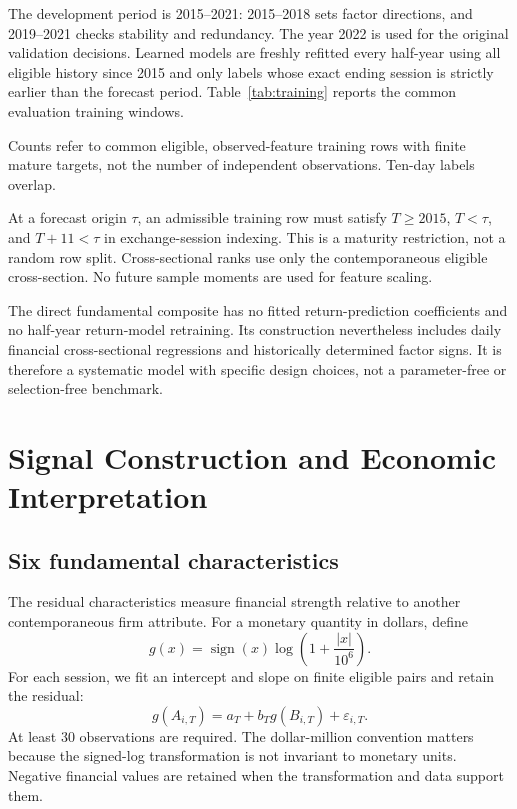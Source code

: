 \documentclass[11pt]{article}
\newcommand{\resulttable}[3]{\begin{table}[H]\centering\caption{#2}\label{tab:#1}\small\par\vspace{3pt}\begin{minipage}{\textwidth}\footnotesize #3\end{minipage}\end{table}}
\begin{document}
The development period is 2015--2021: 2015--2018 sets factor directions, and 2019--2021 checks stability and redundancy. The year 2022 is used for the original validation decisions. Learned models are freshly refitted every half-year using all eligible history since 2015 and only labels whose exact ending session is strictly earlier than the forecast period. Table~\ref{tab:training} reports the common evaluation training windows.
\resulttable{training}{Expanding training windows for the original learned models.}{Counts refer to common eligible, observed-feature training rows with finite mature targets, not the number of independent observations. Ten-day labels overlap.}

At a forecast origin $\tau$, an admissible training row must satisfy $T\geq 2015$, $T<\tau$, and $T+11<\tau$ in exchange-session indexing. This is a maturity restriction, not a random row split. Cross-sectional ranks use only the contemporaneous eligible cross-section. No future sample moments are used for feature scaling.

The direct fundamental composite has no fitted return-prediction coefficients and no half-year return-model retraining. Its construction nevertheless includes daily financial cross-sectional regressions and historically determined factor signs. It is therefore a systematic model with specific design choices, not a parameter-free or selection-free benchmark.
\clearpage

\section{Signal Construction and Economic Interpretation}
\subsection{Six fundamental characteristics}
The residual characteristics measure financial strength relative to another contemporaneous firm attribute. For a monetary quantity in dollars, define
\begin{equation}
g(x)=\operatorname{sign}(x)\log\left(1+\frac{|x|}{10^6}\right).
\end{equation}
For each session, we fit an intercept and slope on finite eligible pairs and retain the residual:
\begin{equation}
g(A_{i,T})=a_T+b_Tg(B_{i,T})+\varepsilon_{i,T}.
\label{eq:residual}
\end{equation}
At least 30 observations are required. The dollar-million convention matters because the signed-log transformation is not invariant to monetary units. Negative financial values are retained when the transformation and data support them.
\end{document}
